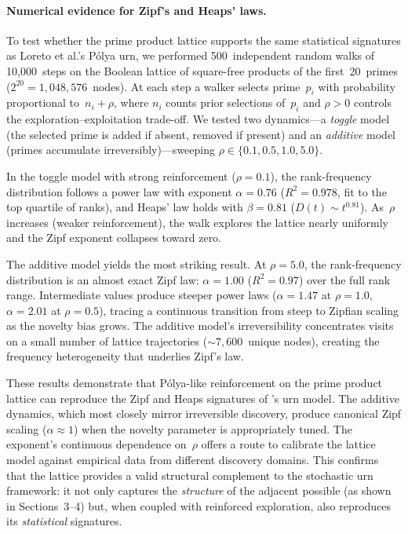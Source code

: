 \paragraph{Numerical evidence for Zipf's and Heaps' laws.}
To test whether the prime product lattice supports the same statistical
signatures as Loreto et al.'s P\'olya urn, we performed
500~independent random walks of 10{,}000~steps on the Boolean lattice
of square-free products of the first~20~primes
($2^{20} = 1{,}048{,}576$~nodes).  At each step a walker selects
prime~$p_i$ with probability proportional to~$n_i + \rho$, where $n_i$
counts prior selections of~$p_i$ and $\rho > 0$ controls the
exploration--exploitation trade-off.  We tested two dynamics---a
\emph{toggle} model (the selected prime is added if absent, removed if
present) and an \emph{additive} model (primes accumulate
irreversibly)---sweeping $\rho \in \{0.1, 0.5, 1.0, 5.0\}$.

In the toggle model with strong reinforcement ($\rho = 0.1$), the
rank-frequency distribution follows a power law with exponent
$\alpha = 0.76$ ($R^2 = 0.978$, fit to the top quartile of ranks),
and Heaps' law holds with $\beta = 0.81$ ($D(t) \sim t^{0.81}$).
As~$\rho$ increases (weaker reinforcement), the walk explores the
lattice nearly uniformly and the Zipf exponent collapses toward zero.

The additive model yields the most striking result.  At $\rho = 5.0$,
the rank-frequency distribution is an almost exact Zipf law:
$\alpha = 1.00$ ($R^2 = 0.97$) over the full rank range.  Intermediate
values produce steeper power laws ($\alpha = 1.47$ at $\rho = 1.0$,
$\alpha = 2.01$ at $\rho = 0.5$), tracing a continuous transition from
steep to Zipfian scaling as the novelty bias grows.  The additive model's
irreversibility concentrates visits on a small number of lattice
trajectories ($\sim 7{,}600$~unique nodes), creating the
frequency heterogeneity that underlies Zipf's law.

These results demonstrate that P\'olya-like reinforcement on the prime
product lattice can reproduce the Zipf and Heaps signatures of
\citet{loreto2017}'s urn model.  The additive dynamics, which most
closely mirror irreversible discovery, produce canonical Zipf scaling
($\alpha \approx 1$) when the novelty parameter is appropriately tuned.
The exponent's continuous dependence on~$\rho$ offers a route to
calibrate the lattice model against empirical data from different
discovery domains.  This confirms that the lattice provides a valid
structural complement to the stochastic urn framework: it not only
captures the \emph{structure} of the adjacent possible (as shown in
Sections~3--4) but, when coupled with reinforced exploration, also
reproduces its \emph{statistical} signatures.
